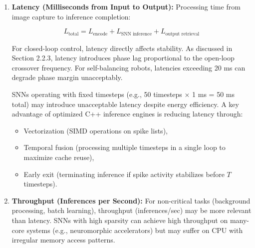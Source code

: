 \begin{enumerate}
\begin{itemize}
        \item Integrated power monitoring: Modern microcontrollers (e.g., STM32H7, nRF52) include internal ADCs 
        for sampling supply current.
        
        \item Bench oscilloscopes: Capturing voltage across a known series resistor to compute instantaneous current.
    \end{itemize}

For a system performing $N$ inferences over time $T$, average power is:

$$P_{\text{avg}} = \frac{1}{T} \int_0^T P(t) \, dt$$

and energy per inference is:

$$E_{\text{per-inference}} = \frac{\text{Total Energy}}{N} = \frac{P_{\text{avg}} \times T}{N}$$

This metric is hardware-specific and realistic but does not distinguish algorithm efficiency from implementation 
artifacts (poor optimization, suboptimal clock gating, etc.). Research claiming energy efficiency gains must include 
this measurement to be credible.

    
\item \textbf{Latency (Milliseconds from Input to Output):}
Processing time from image capture to inference completion:

$$L_{\text{total}} = L_{\text{encode}} + L_{\text{SNN inference}} + L_{\text{output retrieval}}$$

For closed-loop control, latency directly affects stability. As discussed in Section 2.2.3, latency introduces 
phase lag proportional to the open-loop crossover frequency. For self-balancing robots, latencies exceeding 20 ms 
can degrade phase margin unacceptably.

SNNs operating with fixed timesteps (e.g., 50 timesteps × 1 ms = 50 ms total) may introduce unacceptable latency 
despite energy efficiency. A key advantage of optimized C++ inference engines is reducing latency through:
    \begin{itemize}
        \item Vectorization (SIMD operations on spike lists),
        \item Temporal fusion (processing multiple timesteps in a single loop to maximize cache reuse),
        \item Early exit (terminating inference if spike activity stabilizes before $T$ timesteps).
    \end{itemize}

    
\item \textbf{Throughput (Inferences per Second):}
For non-critical tasks (background processing, batch learning), throughput (inferences/sec) may be more relevant 
than latency. SNNs with high sparsity can achieve high throughput on many-core systems (e.g., neuromorphic accelerators) 
but may suffer on CPU with irregular memory access patterns.

\end{enumerate}

